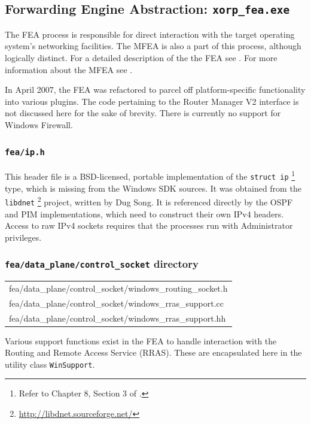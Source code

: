 \documentclass[11pt]{article}
\begin{document}
{%
\subsection{Forwarding Engine Abstraction: {\tt xorp\_fea.exe}}

The FEA process is responsible for direct interaction with the
target operating system's networking facilities. The MFEA is also
a part of this process, although logically distinct. For a detailed
description of the the FEA see \cite{xorp:fea}. For more information
about the MFEA see \cite{xorp:mfea}.

In April 2007, the FEA was refactored to parcel off platform-specific
functionality into various plugins. The code pertaining to the Router
Manager V2 interface is not discussed here for the sake of brevity.
There is currently no support for Windows Firewall.

\subsubsection{{\tt fea/ip.h}}

This header file is a BSD-licensed, portable implementation of the
{\tt struct ip}
\footnote{Refer to Chapter 8, Section 3 of \cite{books/aw/WrightS95}.}
type, which is missing from the Windows SDK sources.
It was obtained from the {\tt libdnet}
\footnote{\url{http://libdnet.sourceforge.net/}}
project, written by Dug Song.
It is referenced directly by the OSPF and PIM implementations,
which need to construct their own IPv4 headers. 
Access to raw IPv4 sockets requires that the processes run with
Administrator privileges.

\subsubsection{{\tt fea/data\_plane/control\_socket} directory}

\begin{center}
\begin{tabular}{|l|}
 \hline
	fea/data\_plane/control\_socket/windows\_routing\_socket.h \\
	fea/data\_plane/control\_socket/windows\_rras\_support.cc \\
	fea/data\_plane/control\_socket/windows\_rras\_support.hh \\ 
 \hline
\end{tabular}
\end{center}

Various support functions exist in the FEA to handle
interaction with the Routing and Remote Access Service (RRAS).
These are encapsulated here in the utility class {\tt WinSupport}.

}
\end{document}
